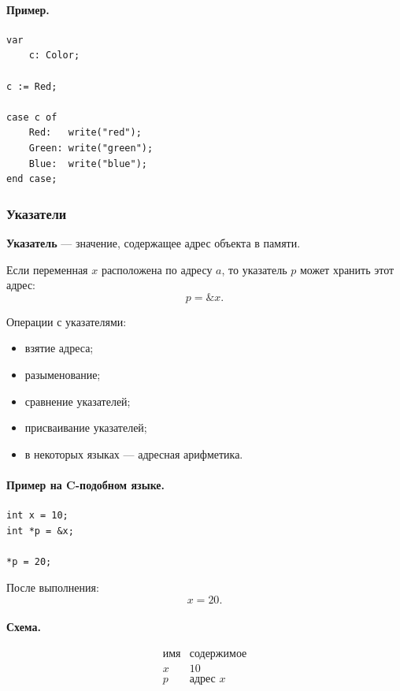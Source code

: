 \documentclass[12pt,a4paper]{article}
\begin{document}
\paragraph{Пример.}

\begin{verbatim}
var
    c: Color;

c := Red;

case c of
    Red:   write("red");
    Green: write("green");
    Blue:  write("blue");
end case;
\end{verbatim}

\subsubsection{Указатели}

\textbf{Указатель} --- значение, содержащее адрес объекта в памяти.

Если переменная $x$ расположена по адресу $a$, то указатель $p$ может хранить этот адрес:
\[
    p = \&x.
\]

Операции с указателями:
\begin{itemize}
    \item взятие адреса;
    \item разыменование;
    \item сравнение указателей;
    \item присваивание указателей;
    \item в некоторых языках --- адресная арифметика.
\end{itemize}

\paragraph{Пример на C-подобном языке.}

\begin{verbatim}
int x = 10;
int *p = &x;

*p = 20;
\end{verbatim}

После выполнения:
\[
    x = 20.
\]

\paragraph{Схема.}

\[
\begin{array}{c|c}
\text{имя} & \text{содержимое}\\
\hline
x & 10\\
p & \text{адрес } x
\end{array}
\]
\end{document}
